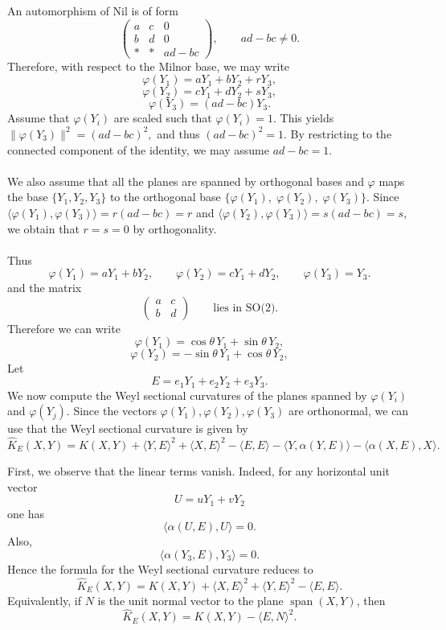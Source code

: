 \documentclass[12pt]{article}
\begin{document}
An automorphism of Nil is of form
\[
\begin{pmatrix}
a & c & 0\\
b & d & 0\\
* & * & ad-bc
\end{pmatrix},
\qquad ad-bc\neq 0.
\]
Therefore, with respect to the Milnor base, we may write
\[
\varphi(Y_1)=aY_1+bY_2+rY_3,
\]
\[
\varphi(Y_2)=cY_1+dY_2+sY_3,
\]
\[
\varphi(Y_3)=(ad-bc)Y_3.
\]
Assume that $\varphi(Y_i)$ are scaled such that $\varphi(Y_i) = 1$. This yields
$\|\varphi(Y_3)\|^2=(ad-bc)^2,$ and thus $(ad-bc)^2 = 1$. By restricting to the connected component of the identity, we may assume $ad - bc = 1$. \\~\\
We also assume that all the planes are spanned by orthogonal bases and $\varphi$ maps the base $\{Y_1,Y_2,Y_3\}$ to the orthogonal base $\{\varphi(Y_1),\;\varphi(Y_2),\; \varphi(Y_3)\}$. Since $
\langle \varphi(Y_1),\varphi(Y_3)\rangle=r(ad-bc)=r$ and $\langle \varphi(Y_2),\varphi(Y_3)\rangle=s(ad-bc)=s,$ we obtain that $r=s=0$ by orthogonality. \\~\\
Thus
\[
\varphi(Y_1)=aY_1+bY_2,
\qquad
\varphi(Y_2)=cY_1+dY_2,
\qquad
\varphi(Y_3)=Y_3.
\]
and the matrix
\[
\begin{pmatrix}
a & c\\
b & d
\end{pmatrix} \qquad \text{lies in SO(2).}
\]
Therefore we can write
\[
\varphi(Y_1)=\cos\theta\,Y_1+\sin\theta\,Y_2,
\]
\[
\varphi(Y_2)=-\sin\theta\,Y_1+\cos\theta\,Y_2,
\]
Let
\[
E=e_1Y_1+e_2Y_2+e_3Y_3.
\]
We now compute the Weyl sectional curvatures of the planes spanned by
\(\varphi(Y_i)\) and \(\varphi(Y_j)\). Since the vectors
\(\varphi(Y_1),\varphi(Y_2),\varphi(Y_3)\) are orthonormal, we can use that the Weyl sectional curvature is given by
\[\widehat K_E(X,Y)=K(X,Y)+\langle Y,E\rangle^2+\langle X,E\rangle^2-\langle E,E\rangle-\langle Y,\alpha(Y,E)\rangle-\langle \alpha(X,E),X\rangle.\]

First, we observe that the linear terms vanish. Indeed, for any horizontal
unit vector
\[
U=uY_1+vY_2
\]
one has
\[
\langle \alpha(U,E),U\rangle=0.
\]
Also,
\[
\langle \alpha(Y_3,E),Y_3\rangle=0.
\]
Hence the formula for the Weyl sectional curvature reduces to
\[\widehat K_E(X,Y)=K(X,Y)+\langle X,E\rangle^2+\langle Y,E\rangle^2-\langle E,E\rangle.\]
Equivalently, if \(N\) is the unit normal vector to the plane
\(\operatorname{span}(X,Y)\), then
\[
\widehat K_E(X,Y)
=
K(X,Y)-\langle E,N\rangle^2.
\]
\end{document}
